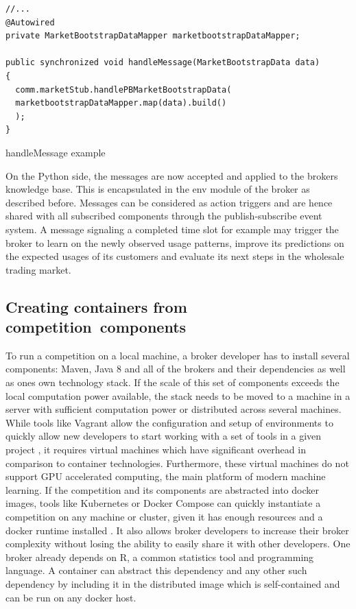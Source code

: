 \begin{listing}
    \begin{verbatim}
//...
@Autowired
private MarketBootstrapDataMapper marketbootstrapDataMapper;

public synchronized void handleMessage(MarketBootstrapData data)
{
  comm.marketStub.handlePBMarketBootstrapData(
  marketbootstrapDataMapper.map(data).build()
  );
}
    \end{verbatim}
    \caption{handleMessage example}
    \label{lst:handlemessageexample}
\end{listing}

On the Python side, the messages are now accepted and applied to the brokers knowledge base. This is encapsulated in the
env module of the broker as described before. Messages can be considered as action triggers and are hence
shared with all subscribed components through the publish-subscribe event system. A message signaling a completed
time slot for example may trigger the broker to learn on the newly observed usage patterns, improve its predictions on
the expected usages of its customers and evaluate its next steps in the wholesale trading market.

\subsection{Creating containers from competition\ components}
\label{sec:creating_containers_from_competition_components}

To run a competition on a local machine, a broker developer has to install several components: Maven, Java 8 and all of the brokers and
their dependencies as well as ones own technology stack. If the scale of this set of components exceeds the local
computation power available, the stack needs to be moved to a machine in a server with sufficient computation power or
distributed across several machines.
While tools like Vagrant allow
the configuration and setup of environments to quickly allow new developers to start working with a set of tools in a
given project \citep{vagrant} , it requires virtual machines which have significant overhead in comparison to container
technologies. Furthermore, these virtual machines do not support \ac{GPU} accelerated computing, the main platform of
modern machine learning. If the competition and its components are abstracted into docker images, tools like Kubernetes
or Docker Compose can quickly instantiate a competition on any machine or cluster, given it has enough resources and a
docker runtime installed \citep{docker}. It also allows broker developers to increase their broker complexity without
losing the ability to easily share it with other developers. One broker already depends on R, a common statistics tool
and programming language. A container can abstract this dependency and any other such dependency by including it in
the distributed image which is self-contained and can be run on any docker host.

